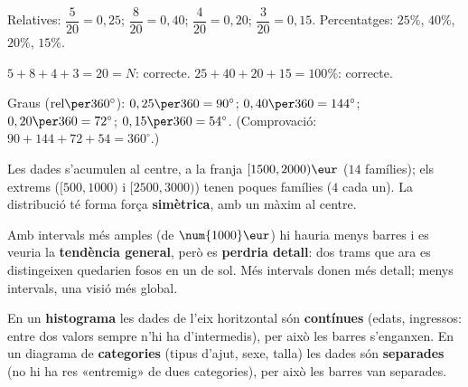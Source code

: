 \begin{solucions}
\begin{sollist}
  \item Relatives: $\dfrac{5}{20}=0,25$; $\dfrac{8}{20}=0,40$; $\dfrac{4}{20}=0,20$;
        $\dfrac{3}{20}=0,15$. Percentatges: $25\%$, $40\%$, $20\%$, $15\%$.
  \item $5+8+4+3=20=N$: correcte. $25+40+20+15=100\%$: correcte.
  \item Graus ($\text{rel}\per 360^\circ$): $0,25\per 360=90^\circ$;
        $0,40\per 360=144^\circ$; $0,20\per 360=72^\circ$; $0,15\per 360=54^\circ$.
        (Comprovació: $90+144+72+54=360^\circ$.)
  \item Les dades s'acumulen al centre, a la franja $[1500,2000)\eur$ ($14$ famílies);
        els extrems ($[500,1000)$ i $[2500,3000)$) tenen poques famílies ($4$ cada un).
        La distribució té forma força \textbf{simètrica}, amb un màxim al centre.
  \item Amb intervals més amples (de $\num{1000}\eur$) hi hauria menys barres i es
        veuria la \textbf{tendència general}, però es \textbf{perdria detall}: dos
        trams que ara es distingeixen quedarien fosos en un de sol. Més intervals donen
        més detall; menys intervals, una visió més global.
  \item En un \textbf{histograma} les dades de l'eix horitzontal són \textbf{contínues}
        (edats, ingressos: entre dos valors sempre n'hi ha d'intermedis), per això les
        barres s'enganxen. En un diagrama de \textbf{categories} (tipus d'ajut, sexe,
        talla) les dades són \textbf{separades} (no hi ha res «entremig» de dues
        categories), per això les barres van separades.
\end{sollist}
\end{solucions}
